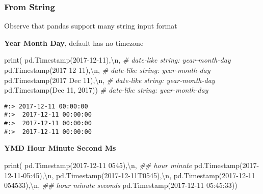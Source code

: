 \documentclass[
]{book}
\newenvironment{Shaded}{\begin{snugshade}}{\end{snugshade}}
\newcommand{\BuiltInTok}[1]{#1}
\newcommand{\CharTok}[1]{\textcolor[rgb]{0.5,0.5,0.5}{#1}}
\newcommand{\CommentTok}[1]{\textcolor[rgb]{0.37,0.37,0.37}{\textit{#1}}}
\newcommand{\NormalTok}[1]{#1}
\newcommand{\StringTok}[1]{\textcolor[rgb]{0.5,0.5,0.5}{#1}}
\begin{document}
\hypertarget{from-string}{%
\subsubsection{From String}\label{from-string}}

Observe that pandas support many string input format

\textbf{Year Month Day}, default has no timezone

\begin{Shaded}
\begin{Highlighting}[]
\BuiltInTok{print}\NormalTok{( pd.Timestamp(}\StringTok{\textquotesingle{}2017{-}12{-}11\textquotesingle{}}\NormalTok{),}\StringTok{\textquotesingle{}}\CharTok{\textbackslash{}n}\StringTok{\textquotesingle{}}\NormalTok{,   }\CommentTok{\# date{-}like string: year{-}month{-}day}
\NormalTok{       pd.Timestamp(}\StringTok{\textquotesingle{}2017 12 11\textquotesingle{}}\NormalTok{),}\StringTok{\textquotesingle{}}\CharTok{\textbackslash{}n}\StringTok{\textquotesingle{}}\NormalTok{,   }\CommentTok{\# date{-}like string: year{-}month{-}day}
\NormalTok{       pd.Timestamp(}\StringTok{\textquotesingle{}2017 Dec 11\textquotesingle{}}\NormalTok{),}\StringTok{\textquotesingle{}}\CharTok{\textbackslash{}n}\StringTok{\textquotesingle{}}\NormalTok{,  }\CommentTok{\# date{-}like string: year{-}month{-}day}
\NormalTok{       pd.Timestamp(}\StringTok{\textquotesingle{}Dec 11, 2017\textquotesingle{}}\NormalTok{))      }\CommentTok{\# date{-}like string: year{-}month{-}day}
\end{Highlighting}
\end{Shaded}

\begin{verbatim}
#:> 2017-12-11 00:00:00 
#:>  2017-12-11 00:00:00 
#:>  2017-12-11 00:00:00 
#:>  2017-12-11 00:00:00
\end{verbatim}

\textbf{YMD Hour Minute Second Ms}

\begin{Shaded}
\begin{Highlighting}[]
\BuiltInTok{print}\NormalTok{( pd.Timestamp(}\StringTok{\textquotesingle{}2017{-}12{-}11 0545\textquotesingle{}}\NormalTok{),}\StringTok{\textquotesingle{}}\CharTok{\textbackslash{}n}\StringTok{\textquotesingle{}}\NormalTok{,     }\CommentTok{\#\# hour minute}
\NormalTok{       pd.Timestamp(}\StringTok{\textquotesingle{}2017{-}12{-}11{-}05:45\textquotesingle{}}\NormalTok{),}\StringTok{\textquotesingle{}}\CharTok{\textbackslash{}n}\StringTok{\textquotesingle{}}\NormalTok{,}
\NormalTok{       pd.Timestamp(}\StringTok{\textquotesingle{}2017{-}12{-}11T0545\textquotesingle{}}\NormalTok{),}\StringTok{\textquotesingle{}}\CharTok{\textbackslash{}n}\StringTok{\textquotesingle{}}\NormalTok{,}
\NormalTok{       pd.Timestamp(}\StringTok{\textquotesingle{}2017{-}12{-}11 054533\textquotesingle{}}\NormalTok{),}\StringTok{\textquotesingle{}}\CharTok{\textbackslash{}n}\StringTok{\textquotesingle{}}\NormalTok{,   }\CommentTok{\#\# hour minute seconds}
\NormalTok{       pd.Timestamp(}\StringTok{\textquotesingle{}2017{-}12{-}11 05:45:33\textquotesingle{}}\NormalTok{))}
\end{Highlighting}
\end{Shaded}
\end{document}
